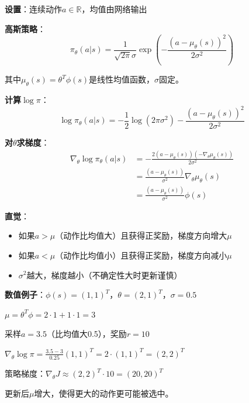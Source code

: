 \documentclass[11pt,a4paper]{article}
\theoremstyle{definition}
\begin{document}
\begin{calculation}
\textbf{设置}：连续动作$a \in \mathbb{R}$，均值由网络输出

\textbf{高斯策略}：
\[
\pi_\theta(a|s) = \frac{1}{\sqrt{2\pi}\sigma} \exp\left(-\frac{(a - \mu_\theta(s))^2}{2\sigma^2}\right)
\]

其中$\mu_\theta(s) = \theta^T \phi(s)$是线性均值函数，$\sigma$固定。

\textbf{计算$\log \pi$}：
\[
\log \pi_\theta(a|s) = -\frac{1}{2}\log(2\pi\sigma^2) - \frac{(a - \mu_\theta(s))^2}{2\sigma^2}
\]

\textbf{对$\theta$求梯度}：
\begin{align*}
\nabla_\theta \log \pi_\theta(a|s) &= -\frac{2(a - \mu_\theta(s))(-\nabla_\theta \mu_\theta(s))}{2\sigma^2} \\
&= \frac{(a - \mu_\theta(s))}{\sigma^2} \nabla_\theta \mu_\theta(s) \\
&= \frac{(a - \mu_\theta(s))}{\sigma^2} \phi(s)
\end{align*}

\textbf{直觉}：
\begin{itemize}
    \item 如果$a > \mu$（动作比均值大）且获得正奖励，梯度方向增大$\mu$
    \item 如果$a < \mu$（动作比均值小）且获得正奖励，梯度方向减小$\mu$
    \item $\sigma^2$越大，梯度越小（不确定性大时更新谨慎）
\end{itemize}

\textbf{数值例子}：$\phi(s) = (1, 1)^T$，$\theta = (2, 1)^T$，$\sigma = 0.5$

$\mu = \theta^T \phi = 2 \cdot 1 + 1 \cdot 1 = 3$

采样$a = 3.5$（比均值大0.5），奖励$r = 10$

$\nabla_\theta \log \pi = \frac{3.5 - 3}{0.25} (1, 1)^T = 2 \cdot (1, 1)^T = (2, 2)^T$

策略梯度：$\nabla_\theta J \approx (2, 2)^T \cdot 10 = (20, 20)^T$

更新后$\mu$增大，使得更大的动作更可能被选中。
\end{calculation}
\end{document}
